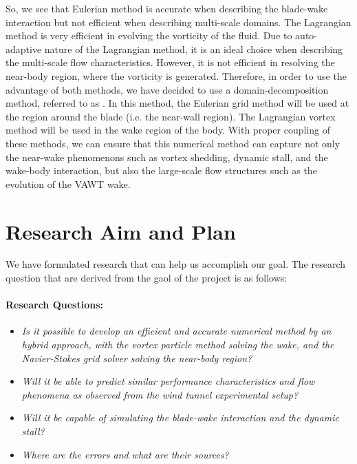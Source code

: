 So, we see that Eulerian method is accurate when describing the blade-wake interaction but not efficient when describing multi-scale domains. The Lagrangian method is very efficient in evolving the vorticity of the fluid. Due to auto-adaptive nature of the Lagrangian method, it is an ideal choice when describing the multi-scale flow characteristics. However, it is not efficient in resolving the near-body region, where the vorticity is generated. Therefore, in order to use the advantage of both methods, we have decided to use a domain-decomposition method, referred to as . In this method, the Eulerian grid method will be used at the region around the blade (i.e. the near-wall region). The Lagrangian vortex method will be used in the wake region of the body. With proper coupling of these methods, we can ensure that this numerical method can capture not only the near-wake phenomenons such as vortex shedding, dynamic stall, and the wake-body interaction, but also the large-scale flow structures such as the evolution of the VAWT wake.

\section{Research Aim and Plan}

We have formulated research that can help us accomplish our goal. The research question that are derived from the gaol of the project is as follows:

\paragraph*{Research Questions:}
	\begin{itemize}
	\item \textit{Is it possible to develop an efficient and accurate numerical method by an
	hybrid approach, with the vortex particle method solving the wake, and the Navier-Stokes grid solver solving the near-body region?}
	
	\item \textit{Will it be able to predict similar performance characteristics and flow phenomena as observed from the wind tunnel experimental setup?}
	
	\item \textit{Will it be capable of simulating the blade-wake interaction and the dynamic stall?}
	
	\item \textit{Where are the errors and what are their sources?}
	\end{itemize}

